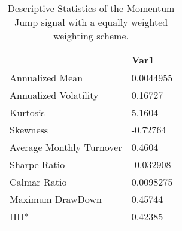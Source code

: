 \begin{table}[H]
\centering
\begin{tabular}{ll}
& Var1 \\ 
\hline 
Annualized Mean & 0.0044955 \\ 
Annualized Volatility & 0.16727 \\ 
Kurtosis & 5.1604 \\ 
Skewness & -0.72764 \\ 
Average Monthly Turnover & 0.4604 \\ 
Sharpe Ratio & -0.032908 \\ 
Calmar Ratio & 0.0098275 \\ 
Maximum DrawDown & 0.45744 \\ 
HH* & 0.42385 \\ 
\hline
\end{tabular}
\caption{Descriptive Statistics of the Momentum Jump signal with a equally weighted weighting scheme.}
\label{MOMJUMPEW}
\end{table}